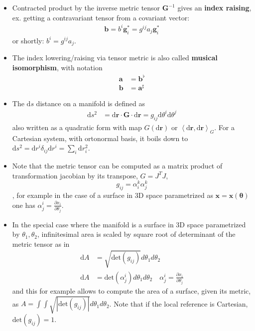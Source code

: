 \documentclass{digitaldynamics}
\def\vect#1{\bm{#1}}
\def\vcovar#1{{\bm{#1}}^*}
\def\tensor#1{\bm{#1}}
\begin{document}
\begin{itemize}
	\item Contracted product by the inverse metric tensor $\tensor{G}^{-1}$ gives an \textbf{index raising}, ex. getting a contravariant tensor from a covariant vector:
	\begin{align}
	  \tensor {b} = b^i \vcovar{g}_i = g^{ij} a_j \vcovar{g}_i
	\label{eq:raising}
	\end{align}
	or shortly: $b^i = g^{ij} a_j$.
	
	\item The index lowering/raising via tensor metric is also called \textbf{musical isomorphism}, with notation
	\begin{align}
	  \tensor {a} &= \tensor{b}^\flat \\
		\tensor {b} &= \tensor{a}^\sharp 
	\label{eq:musical}
	\end{align}
	
	\item The $\mathrm{d}s$ distance on a manifold is defined as
	\begin{align}
	  \mathrm{d}s^2 &= \mathrm{d}\tensor{r} \cdot \tensor{G} \cdot \mathrm{d}\tensor{r} = g_{ij} \mathrm{d}\theta^i \mathrm{d}\theta^j
	\label{eq:distance}
	\end{align}
	also written as a quadratic form with map $G(\mathrm{d}\tensor{r})$ or $\left\langle \mathrm{d}\tensor{r}, \mathrm{d}\tensor{r} \right\rangle_G$.
	For a Cartesian system, with ortonormal basis, it boils down to $\mathrm{d}s^2 = \mathrm{d}r^i \delta_{ij} \mathrm{d}r^i = \sum_i \mathrm{d}r_i^2$.
	
	\item Note that the metric tensor can be computed as a matrix product of transformation jacobian by its transpose, $G = J^T J$,  
	\[ 
		g_{ij} = \alpha^k_i \alpha^k_j
	\], 
	for example in the case of a surface in 3D space parametrized as $\vect{x}=\vect{x}(\vect{\theta})$ one has $\alpha^i_j = \frac{\partial x_i}{\partial \theta_j}$.
	
	\item In the special case where the manifold is a surface in 3D space parametrized by $\theta_1, \theta_2$, infinitesimal area is scaled by square root of determinant of the metric tensor as in
	\begin{align}
	  \mathrm{d}A &= \sqrt{\mathrm{det}(g_{ij})} d\theta_1 d\theta_2 \\
		\mathrm{d}A &= \mathrm{det}(\alpha^i_j) d\theta_1 d\theta_2   \quad  \alpha^i_j = \frac{\partial x_i}{\partial \theta_j}
	\label{eq:darea}
	\end{align}
	and this for example allows to compute the area of a surface, given its metric, as $A=\int\int \sqrt{|\mathrm{det}(g_{ij})|} d\theta_1 d\theta_2$. Note that if the local reference is Cartesian, $\mathrm{det}(g_{ij}) = 1$.
	

\end{itemize}
\end{document}
